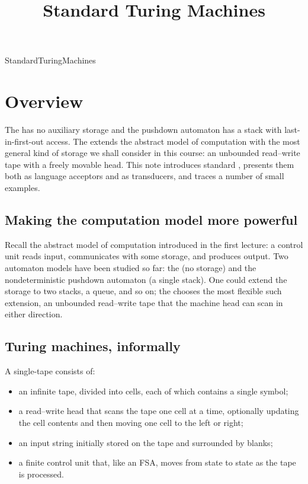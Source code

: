 \documentclass[hidelinks]{article}
\title{Standard Turing Machines}
\author{}
\date{}
\begin{document}
\maketitle

\begin{smodule}[title={Standard Turing Machines}]{StandardTuringMachines}


\section{Overview}

The  has no auxiliary storage and the pushdown automaton has a stack with last-in-first-out access. The  extends the abstract model of computation with the most general kind of storage we shall consider in this course: an unbounded read--write tape with a freely movable head. This note introduces standard , presents them both as language acceptors and as transducers, and traces a number of small examples.

\subsection{Making the computation model more powerful}

Recall the abstract model of computation introduced in the first lecture: a control unit reads input, communicates with some storage, and produces output. Two automaton models have been studied so far: the  (no storage) and the nondeterministic pushdown automaton (a single stack). One could extend the storage to two stacks, a queue, and so on; the  chooses the most flexible such extension, an unbounded read--write tape that the machine head can scan in either direction.

\subsection{Turing machines, informally}

A single-tape  consists of:
\begin{itemize}
  \item an infinite tape, divided into cells, each of which contains a single symbol;
  \item a read--write head that scans the tape one cell at a time, optionally updating the cell contents and then moving one cell to the left or right;
  \item an input string initially stored on the tape and surrounded by blanks;
  \item a finite control unit that, like an FSA, moves from state to state as the tape is processed.
\end{itemize}


\end{smodule}
\end{document}
